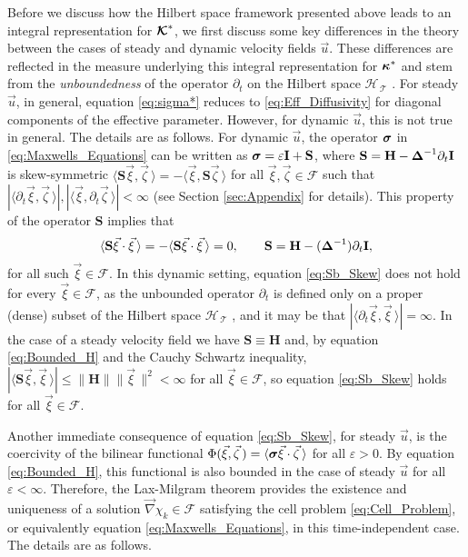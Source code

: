 \documentclass[11pt]{amsart}
\newcommand{\Hb}{\mathbf{H}}
\newcommand{\Ib}{\mathbf{I}}
\newcommand{\Sb}{\mathbf{S}}
\newcommand\Kbc{\mbox{\boldmath${\mathcal{K}}$}}
\newcommand{\Tc}{\mathcal{T}}
\newcommand{\Hs}{\mathscr{H}}
\newcommand{\Fs}{\mathscr{F}}
\newcommand\bsig{\mbox{\boldmath${\sigma}$}}
\newcommand\bDelta{\mbox{\boldmath${\Delta}$}}
\newcommand\bkappa{\mbox{\boldmath${\kappa}$}}
\begin{document}
Before we discuss how the Hilbert space framework presented above
leads to an  integral representation for $\Kbc^*$, we first discuss
some key differences in the theory between the cases of steady 
and dynamic velocity fields $\vec{u}$. These differences are reflected
in the measure underlying this integral representation for $\bkappa^*$
and stem from the \emph{unboundedness} of the operator $\partial_t$ on the
Hilbert space $\Hs_{\,\Tc}$ \cite{Reed-1980,Stone:64}. For steady
$\vec{u}$, in general, equation \eqref{eq:sigma*} reduces to
\eqref{eq:Eff_Diffusivity} for  diagonal components of the effective
parameter.  However, for dynamic $\vec{u}$, this is not true in
general. The details are as follows. For dynamic $\vec{u}$, the
operator $\bsig$ in \eqref{eq:Maxwells_Equations} can be written as
$\bsig=\varepsilon\Ib+\Sb$, where  $\Sb=\Hb-\bDelta^{-1}\partial_t\Ib$ is skew-symmetric 
$\langle\Sb\vec{\xi},\vec{\zeta}\,\rangle=-\langle\vec{\xi},\Sb\vec{\zeta}\,\rangle$ for all
$\vec{\xi},\vec{\zeta}\in\Fs$ such that
$|\langle\partial_t\vec{\xi},\vec{\zeta}\,\rangle|,|\langle\vec{\xi},\partial_t\vec{\zeta}\,\rangle|<\infty$ (see Section
\ref{sec:Appendix} for details).  
This property of the operator $\Sb$ implies that
%
\begin{align}\label{eq:Sb_Skew_2}
  \langle\Sb\vec{\xi}\cdot\vec{\xi}\,\rangle=-\langle\Sb\vec{\xi}\cdot\vec{\xi}\,\rangle=0,
  \qquad
  \Sb=\Hb-(\bDelta^{-1})\partial_t\Ib,
\end{align}
%
for all such $\vec{\xi}\in\Fs$. In this dynamic setting, equation
\eqref{eq:Sb_Skew} does not hold for every $\vec{\xi}\in\Fs$, as the
unbounded operator $\partial_t$ is defined only on a proper (dense) subset of
the Hilbert space $\Hs_{\,\Tc}$ \cite{Reed-1980}, and it may be that
$|\langle\partial_t\vec{\xi},\vec{\xi}\,\rangle|=\infty$. In the case of a steady velocity field
we have $\Sb\equiv\Hb$ and, by equation \eqref{eq:Bounded_H} and the Cauchy
Schwartz inequality, $|\langle\Sb\vec{\xi},\vec{\xi}\,\rangle|\leq\|\Hb\|\|\vec{\xi}\,\|^2<\infty$ for
all $\vec{\xi}\in\Fs$, so equation \eqref{eq:Sb_Skew} holds for all
$\vec{\xi}\in\Fs$.   









Another immediate consequence of equation \eqref{eq:Sb_Skew}, for
steady $\vec{u}$, is the coercivity of the bilinear functional
$\Phi(\vec{\xi},\vec{\zeta}\,)=\langle\bsig\vec{\xi}\cdot\vec{\zeta}\,\rangle$ for all $\varepsilon>0$. By equation
\eqref{eq:Bounded_H}, this functional is also bounded in the case of
steady $\vec{u}$ for all $\varepsilon<\infty$. Therefore, the Lax-Milgram theorem
\cite{McOwen:2003:PDE} provides the existence and uniqueness of a
solution $\vec{\nabla}\chi_k\in\Fs$ satisfying the cell problem
\eqref{eq:Cell_Problem}, or equivalently equation
\eqref{eq:Maxwells_Equations}, in this time-independent case. The
details are as follows. 
\end{document}
